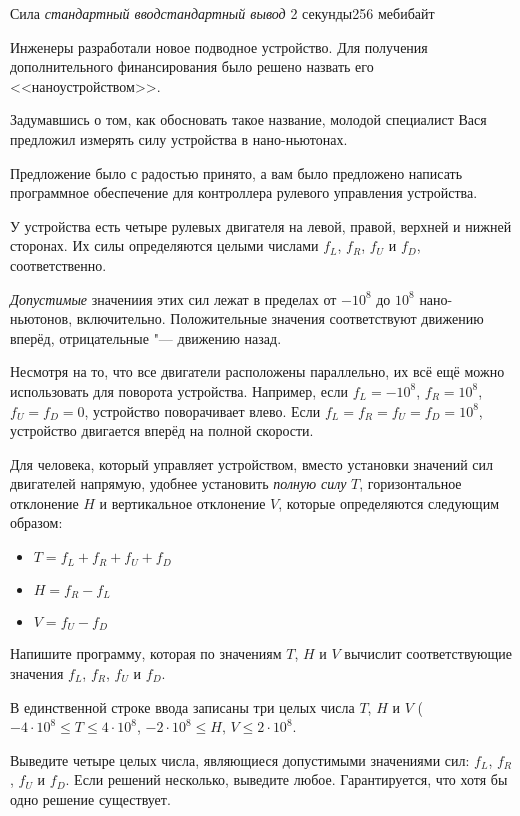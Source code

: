 %
%
\begin{problem}{Сила}
{\textsl{стандартный ввод}}{\textsl{стандартный вывод}}
{2 секунды}{256 мебибайт}{}

Инженеры разработали новое подводное устройство. Для получения дополнительного
финансирования было решено назвать его <<наноустройством>>.

Задумавшись о том, как обосновать такое название, молодой специалист Вася
предложил измерять силу устройства в нано-ньютонах.

Предложение было с радостью принято, а вам было предложено написать
программное обеспечение для контроллера рулевого управления устройства.

У устройства есть четыре рулевых двигателя на левой, правой, верхней
и нижней сторонах. Их силы определяются целыми числами
$f_L$, $f_R$, $f_U$ и $f_D$, соответственно.

\emph{Допустимые} значениия этих сил лежат в пределах
от $-10^8$ до $10^8$ нано-ньютонов, включительно. Положительные значения
соответствуют движению вперёд, отрицательные "--- движению назад.

Несмотря на то, что все двигатели расположены параллельно, их всё ещё можно
использовать для поворота устройства.
Например, если $f_L = -10^8$, $f_R = 10^8$, $f_U = f_D = 0$, устройство
поворачивает влево.
Если $f_L = f_R = f_U = f_D = 10^8$, устройство двигается вперёд на полной
скорости.

Для человека, который управляет устройством, вместо установки значений
сил двигателей напрямую, удобнее установить \emph{полную силу} $T$,
горизонтальное отклонение $H$ и вертикальное отклонение $V$, которые
определяются следующим образом:
\begin{itemize}
  \item $T = f_L + f_R + f_U + f_D$
  \item $H = f_R - f_L$
  \item $V = f_U - f_D$
\end{itemize}

Напишите программу, которая по значениям $T$, $H$ и $V$ вычислит
соответствующие значения $f_L$, $f_R$, $f_U$ и $f_D$. 

\InputFile

В единственной строке ввода записаны три целых числа $T$, $H$ и $V$
($-4 \cdot 10^8\le T \le 4 \cdot 10^8$,
$-2 \cdot 10^8\le H,\,V \le 2 \cdot 10^8$.

\OutputFile

Выведите четыре целых числа, являющиеся допустимыми значениями сил:
$f_L$, $f_R$, $f_U$ и $f_D$.
Если решений несколько, выведите любое. Гарантируется, что
хотя бы одно решение существует.

\Example

\begin{example}
%
\end{example}

\end{problem}
